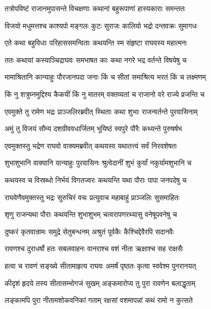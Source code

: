 
\twolineshloka
{तत्रोपविष्टं राजानमुपासन्ते विचक्षणाः}
{कथानां बहुरूपाणां हास्यकाराः समन्ततः} %

\twolineshloka
{विजयो मधुमत्तश्च काश्यपो मङ्गलः कुटः}
{सुराजः कालियो भद्रो दन्तवक्रः सुमागधः} %

\twolineshloka
{एते कथा बहुविधाः परिहाससमन्विताः}
{कथयन्ति स्म संहृष्टा राघवस्य महात्मनः} %

\twolineshloka
{ततः कथायां कस्याञ्चिद्राघवः समभाषत}
{काः कथा नगरे भद्र वर्तन्ते विषयेषु च} %

\twolineshloka
{मामाश्रितानि कान्याहुः पौरजानपदा जनाः}
{किं च सीतां समाश्रित्य भरतं किं च लक्ष्मणम्} %

\twolineshloka
{किं नु शत्रुघ्नमुद्दिश्य कैकयीं किं नु मातरम्}
{वक्तव्यतां च राजानो वरे राज्ये व्रजन्ति च} %

\twolineshloka
{एवमुक्ते तु रामेण भद्रः प्राञ्जलिरब्रवीत्}
{स्थिताः कथा शुभाः राजन्वर्तन्ते पुरवासिनाम्} %

\twolineshloka
{अमुं तु विजयं सौम्य दशग्रीववधार्जितम्}
{भूयिष्ठं स्वपुरे पौरैः कथ्यन्ते पुरुषर्षभ} %

\twolineshloka
{एवमुक्तस्तु भद्रेण राघवो वाक्यमब्रवीत्}
{कथयस्व यथातत्त्वं सर्वं निरवशेषतः} %

\twolineshloka
{शुभाशुभानि वाक्यानि यान्याहुः पुरवासिनः}
{श्रुत्वेदानीं शुभं कुर्यां नकुर्यामशुभानि च} %

\twolineshloka
{कथयस्व च विस्रब्धो निर्भयं विगतज्वरः}
{कथयन्ति यथा पौराः पापा जनपदेषु च} %

\twolineshloka
{राघवेणैवमुक्तस्तु भद्रः सुरुचिरं वचः}
{प्रत्युवाच महाबाहुं प्राञ्जलिः सुसमाहितः} %

\twolineshloka
{शृणु राजन्यथा पौराः कथयन्ति शुभाशुभम्}
{चत्वरापणरथ्यासु वनेषूपवनेषु च} %

\twolineshloka
{दुष्करं कृतवान्रामः समुद्रे सेतुबन्धनम्}
{अश्रुतं पूर्वकैः कैश्चिद्देवैरपि सदानवैः} %

\twolineshloka
{रावणश्च दुराधर्षो हतः सबलवाहनः}
{वानराश्च वशं नीता ऋक्षाश्च सह राक्षसैः} %

\twolineshloka
{हत्वा च रावणं सङ्ख्ये सीतामाहृत्य राघवः}
{अमर्षं पृष्ठतः कृत्वा स्ववेश्म पुनरानयत्} %

\twolineshloka
{कीदृशं हृदये तस्य सीतासम्भोगजं सुखम्}
{अङ्कमारोप्य तु पुरा रावणेन बलाद्धृताम्} %

\twolineshloka
{लङ्कामपि पुरा नीतामशोकवनिकां गताम्}
{रक्षसां वशमापन्नां कथं रामो न कुत्सते} %

